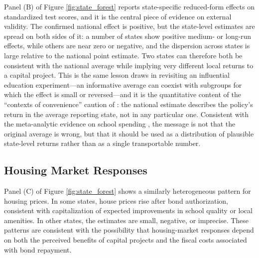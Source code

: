 Panel (B) of Figure \ref{fig:state_forest} reports state-specific reduced-form effects on standardized test scores, and it is the central piece of evidence on external validity. The confirmed national effect is positive, but the state-level estimates are spread on both sides of it: a number of states show positive medium- or long-run effects, while others are near zero or negative, and the dispersion across states is large relative to the national point estimate. Two states can therefore both be consistent with the national average while implying very different local returns to a capital project. This is the same lesson \citet{cummins2017heterogeneous} draws in revisiting an influential education experiment---an informative average can coexist with subgroups for which the effect is small or reversed---and it is the quantitative content of the ``contexts of convenience'' caution of \citet{handel2024contexts}: the national estimate describes the policy's return in the average reporting state, not in any particular one. Consistent with the meta-analytic evidence on school spending \citep{jackson2024impacts}, the message is not that the original average is wrong, but that it should be used as a distribution of plausible state-level returns rather than as a single transportable number.

\subsection{Housing Market Responses}

Panel (C) of Figure \ref{fig:state_forest} shows a similarly heterogeneous pattern for housing prices. In some states, house prices rise after bond authorization, consistent with capitalization of expected improvements in school quality or local amenities. In other states, the estimates are small, negative, or imprecise. These patterns are consistent with the possibility that housing-market responses depend on both the perceived benefits of capital projects and the fiscal costs associated with bond repayment.

